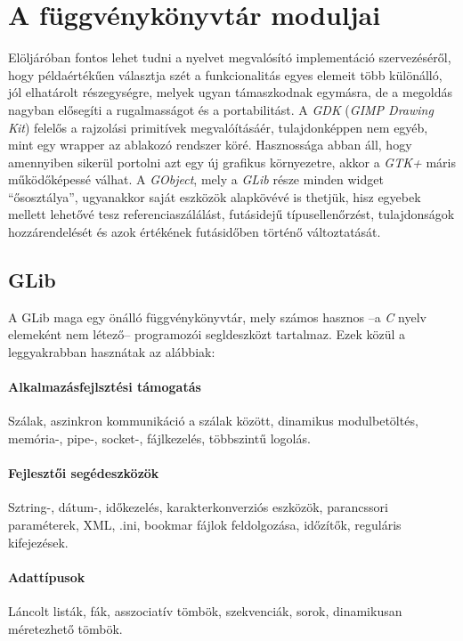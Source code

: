 
\section{A függvénykönyvtár moduljai}

Elöljáróban fontos lehet tudni a nyelvet megvalósító implementáció szervezéséről, hogy példaértékűen választja szét a funkcionalitás egyes elemeit több különálló, jól elhatárolt részegységre, melyek ugyan támaszkodnak egymásra, de a megoldás nagyban elősegíti a rugalmasságot és a portabilitást. A \textit{GDK} (\textit{GIMP Drawing Kit}) felelős a rajzolási primitívek megvalóításáér, tulajdonképpen nem egyéb, mint egy wrapper az ablakozó rendszer köré. Hasznossága abban áll, hogy amennyiben sikerül portolni azt egy új grafikus környezetre, akkor a \textit{GTK+} máris működőképessé válhat. A \textit{GObject}, mely a \textit{GLib} része minden widget ``ősosztálya'', ugyanakkor saját eszközök alapkövévé is thetjük, hisz egyebek mellett lehetővé tesz referenciaszálálást, futásidejű típusellenőrzést, tulajdonságok hozzárendelését és azok értékének futásidőben történő változtatását.

\subsection{GLib}

A GLib maga egy önálló függvénykönyvtár, mely számos hasznos --a \textit{C} nyelv elemeként nem létező-- programozói segldeszközt tartalmaz. Ezek közül a leggyakrabban hasznátak az alábbiak:

\paragraph{Alkalmazásfejlsztési támogatás} Szálak, aszinkron kommunikáció a szálak között, dinamikus modulbetöltés, memória-, pipe-, socket-, fájlkezelés, többszintű logolás.
\paragraph{Fejlesztői segédeszközök} Sztring-, dátum-, időkezelés, karakterkonverziós eszközök, parancssori paraméterek, XML, .ini, bookmar fájlok feldolgozása, időzítők, reguláris kifejezések.
\paragraph{Adattípusok} Láncolt listák, fák, asszociatív tömbök, szekvenciák, sorok, dinamikusan méretezhető tömbök.


